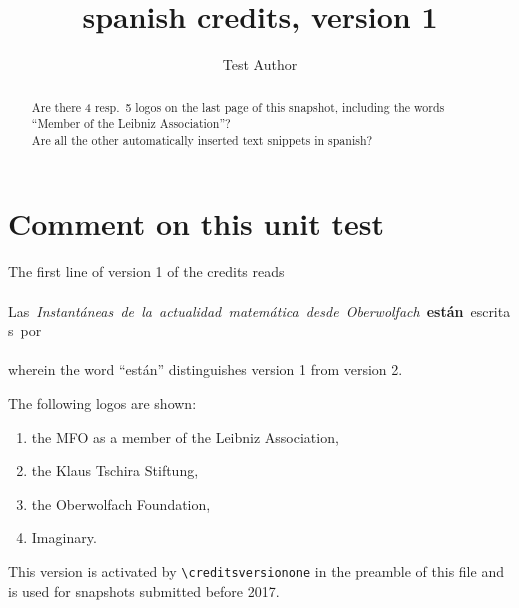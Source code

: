 \documentclass{snapshotmfo}
\author{Test Author}
\title{spanish credits, version 1}
\begin{document}
\begin{abstract}
Are there 4 resp.\ 5 logos on the last page of this snapshot, including the words ``Member of the Leibniz Association''?\\
Are all the other automatically inserted text snippets in spanish?
\end{abstract}

\section{Comment on this unit test}
The first line of version 1 of the credits reads\\
\\
\hbox{Las \emph{Instantáneas de la actualidad matemática desde Oberwolfach} \textbf{están} escritas por}\\
\\
wherein the word ``están'' distinguishes version 1 from version 2.

The following logos are shown:
\begin{enumerate}
  \item the MFO as a member of the Leibniz Association,
  \item the Klaus Tschira Stiftung,
  \item the Oberwolfach Foundation,
  \item Imaginary.
\end{enumerate}
This version is activated by \verb+\creditsversionone+ in the preamble of this file
and is used for snapshots submitted before 2017.
\end{document}
